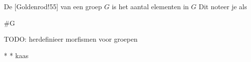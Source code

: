 \textbf{} De [Goldenrod!55] van een groep $G$ is het aantal elementen in $G$ Dit noteer je als
\begin{equationbox}[NavyBlue]
    \#G
\end{equationbox}



TODO: herdefinieer morfismen voor groepen

\begin{niceexercise}*
    \nextpart[]*
    kaas
\end{niceexercise}










